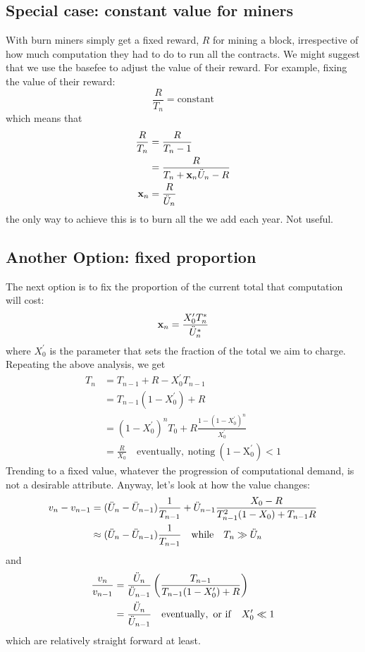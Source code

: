 \documentclass[11pt,a4paper]{article}
\begin{document}
\subsection*{Special case: constant value for miners}

With \ether burn miners simply get a fixed reward, $R$ for mining a block, irrespective of how much computation they had to do to run all the contracts. We might suggest that we use the basefee to adjust the value of their reward. For example, fixing the value of their reward:
\begin{equation}
\frac{R}{T_n} = \mathrm{constant}
\end{equation}
which means that
\begin{align}
\frac{R}{T_n} &= \frac{R}{T_n-1}\\
&= \frac{R}{T_n + \mathbf x_n\ddot{U}_n - R}\\
\mathbf x_n &= \frac{R}{\ddot{U}_n}
\end{align}
\ie the only way to achieve this is to burn all the \ether we add each year. Not useful.

\subsection*{Another Option: fixed proportion}

The next option is to fix the proportion of the current total that computation will cost:
\begin{equation}
\mathbf x_n = \frac{X^\prime_0 T^{*}_n}{\ddot{U}^{*}_n}
\end{equation}
where $X^\prime_0$ is the parameter that sets the fraction of the total we aim to charge. Repeating the above analysis, we get
\begin{align}
T_n &= T_{n-1} + R - X^\prime_0 T_{n-1}\\
&= T_{n-1}(1 - X^\prime_0) + R \\
&= (1 - X^\prime_0)^n T_0 + R\frac{1 - (1 - X^\prime_0)^n}{X^\prime_0}\\
&= \frac{R}{X_0} \quad\mathrm{eventually,\ noting\ (1 - X^\prime_0) < 1 }
\end{align}
Trending to a fixed value, whatever the progression of computational demand, is not a desirable attribute. Anyway, let's look at how the value changes:
\begin{align}
v_n - v_{n-1} &= (\ddot{U}_n - \ddot{U}_{n-1})\frac{1}{T_{n-1}} + \ddot{U}_{n-1}\frac{X_0 - R}{T_{n-1}^2(1 - X_0) + T_{n-1}R}\\
&\approx  (\ddot{U}_n - \ddot{U}_{n-1})\frac{1}{T_{n-1}} \quad\mathrm{while}\quad T_n\gg\ddot{U}_n
\end{align}
and
\begin{align}
\frac{v_n}{v_{n-1}} &= \frac{\ddot{U}_n}{\ddot{U}_{n-1}} \left( \frac{T_{n-1}}{T_{n-1}(1 -X^\prime_0) + R} \right) \\
&= \frac{\ddot{U}_n}{\ddot{U}_{n-1}} \quad\mathrm{eventually,\ or\ if}\quad X^\prime_0 \ll 1
\end{align}
which are relatively straight forward at least.
\end{document}
